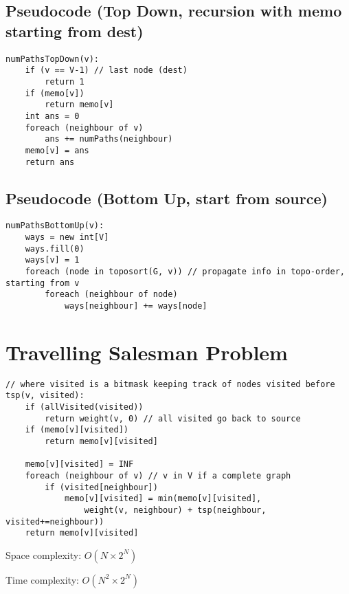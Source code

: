 \documentclass[12pt]{article}
\begin{document}
\begin{spacing}{1.5}
\subsection{Pseudocode (Top Down, recursion with memo starting from dest)}

\begin{verbatim}
numPathsTopDown(v):
    if (v == V-1) // last node (dest)
        return 1
    if (memo[v]) 
        return memo[v]
    int ans = 0
    foreach (neighbour of v)
        ans += numPaths(neighbour)
    memo[v] = ans
    return ans  
\end{verbatim}

\subsection{Pseudocode (Bottom Up, start from source)}

\begin{verbatim}
numPathsBottomUp(v):
    ways = new int[V]
    ways.fill(0)
    ways[v] = 1
    foreach (node in toposort(G, v)) // propagate info in topo-order, starting from v
        foreach (neighbour of node)
            ways[neighbour] += ways[node]
\end{verbatim}

\section{Travelling Salesman Problem}

\begin{verbatim}
// where visited is a bitmask keeping track of nodes visited before
tsp(v, visited):
    if (allVisited(visited))
        return weight(v, 0) // all visited go back to source
    if (memo[v][visited])
        return memo[v][visited]
        
    memo[v][visited] = INF
    foreach (neighbour of v) // v in V if a complete graph
        if (visited[neighbour])
            memo[v][visited] = min(memo[v][visited], 
                weight(v, neighbour) + tsp(neighbour, visited+=neighbour))
    return memo[v][visited]
\end{verbatim}

Space complexity: $O(N \times 2^N)$

Time complexity: $O(N^2 \times 2^N)$

\end{spacing}
\end{document}
